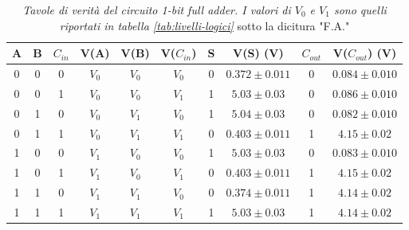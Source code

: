 \begin{table}[H]
  \centering
  \begin{tabular}[t]{c  c  c | c  c  c | c  c | c  c}
    \hline
    A & B & $C_{in}$ & V(A) & V(B) & V($C_{in}$) & S & V(S) (V) & $C_{out}$ & V($C_{out}$) (V) \\
    \hline
    0 & 0 & 0 & $V_{0}$ & $V_{0}$ & $V_{0}$ & 0 & $0.372 \pm 0.011$   & 0 & $0.084 \pm 0.010 $\\
    0 & 0 & 1 & $V_{0}$ & $V_{0}$ & $V_{1}$ & 1 & $5.03 \pm 0.03$   & 0 & $0.086 \pm 0.010$\\
    0 & 1 & 0 & $V_{0}$ & $V_{1}$ & $V_{0}$ & 1 & $5.04 \pm 0.03$   & 0 & $0.082 \pm 0.010$\\
    0 & 1 & 1 & $V_{0}$ & $V_{1}$ & $V_{1}$ & 0 & $0.403 \pm 0.011$ & 1 & $4.15 \pm 0.02$\\
    1 & 0 & 0 & $V_{1}$ & $V_{0}$ & $V_{0}$ & 1 & $5.03 \pm 0.03$   & 0 & $0.083 \pm 0.010$\\
    1 & 0 & 1 & $V_{1}$ & $V_{0}$ & $V_{1}$ & 0 & $0.403 \pm 0.011$ & 1 & $4.15 \pm 0.02$\\
    1 & 1 & 0 & $V_{1}$ & $V_{1}$ & $V_{0}$ & 0 & $0.374 \pm 0.011$ & 1 & $4.14 \pm 0.02$\\
    1 & 1 & 1 & $V_{1}$ & $V_{1}$ & $V_{1}$ & 1 & $5.03 \pm 0.03$   & 1 & $4.14 \pm 0.02$\\
    \hline
  \end{tabular}
  \caption{\emph{Tavole di verità del circuito \emph{1-bit full adder}. I valori di $V_{0}$ e $V_{1}$ sono quelli riportati in tabella \ref{tab:livelli-logici}} sotto la dicitura "F.A."}
  \label{tab:fulladder}
\end{table}
